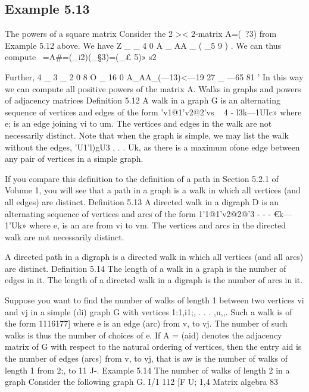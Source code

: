 \subsection{Example 5.13} The powers of a square matrix
Consider the 2 >< 2-matrix
A=(~?3)
from Example 5.12 above. We have
Z _ _ 4 0
A _ AA _ ( _5 9 ) .
We can thus compute
~=A#=(_i2)(_§3)=(_£ 5)»
s2



Further,
4 _ 3 _ 2 0 8 O _ 16 0
A_AA_(—13)<—19 27 _ —65 81 '
In this way we can compute all positive powers of the matrix A.
Walks in graphs and powers of adjacency matrices
Definition 5.12 A walk in a graph G is an alternating sequence of
vertices and edges of the form
’v1@1'v2@2’vs ~ 4 - l3k—1UIc»
where e; is an edge joining vi to um. The vertices and edges in the
walk are not necessarily distinct.
Note that when the graph is simple, we may list the walk without the
edges,
’U1'l)gU3 , . . Uk,
as there is a maximum ofone edge between any pair of vertices in a
simple graph.


If you compare this deﬁnition to the deﬁnition of a path in Section
5.2.1 of Volume 1, you will see that a path in a graph is a walk in
which all vertices (and all edges) are distinct.
Definition 5.13 A directed walk in a digraph D is an alternating
sequence of vertices and arcs of the form
1'1@1'v2@2@'3 - - - €k—1'Uk»
where e, is an are from vi to vm. The vertices and arcs in the directed
walk are not necessarily distinct.


A directed path in a digraph is a directed walk in which all vertices
(and all arcs) are distinct.
Definition 5.14 The length of a walk in a graph is the number of edges
in it. The length of a directed walk in a digraph is the number of
arcs in it.


Suppose you want to ﬁnd the number of walks of length 1 between
two vertices vi and vj in a simple (di) graph G with vertices
1:1,i1;, . . . ,u,,. Such a walk is of the form 1116177] where e is an edge
(arc) from v, to vj. The number of such walks is thus the number of
choices of e. If A = (aid) denotes the adjacency matrix of G with
respect to the natural ordering of vertices, then the entry aid is the
number of edges (arcs) from v, to vj, that is aw is the number of
walks of length 1 from 2;, to 11 J-.
Example 5.14 The number of walks of length 2 in a graph
Consider the following graph G.
I/1 112
[F
U; 1,4
Matrix algebra
83

